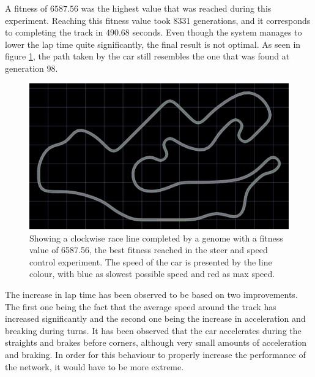 A fitness of $6587.56$ was the highest value that was reached during this experiment. Reaching this fitness value took $8331$ generations, and it corresponds to completing the track in $490.68$ seconds. Even though the system manages to lower the lap time quite significantly, the final result is not optimal. As seen in figure \ref{fig:steerspeedline}, the path taken by the car still resembles the one that was found at generation 98.

\begin{figure}[h]
\includegraphics[width=\textwidth]{report/images/normal_generation_6558}
\centering
\caption{Showing a clockwise race line completed by a genome with a fitness value of 6587.56, the best fitness reached in the steer and speed control experiment. The speed of the car is presented by the line colour, with blue as slowest possible speed and red as max speed.}
\label{fig:steerspeedline}
\end{figure}

The increase in lap time has been observed to be based on two improvements. The first one being the fact that the average speed around the track has increased significantly and the second one being the increase in acceleration and breaking during turns. It has been observed that the car accelerates during the straights and brakes before corners, although very small amounts of acceleration and braking. In order for this behaviour to properly increase the performance of the network, it would have to be more extreme.


